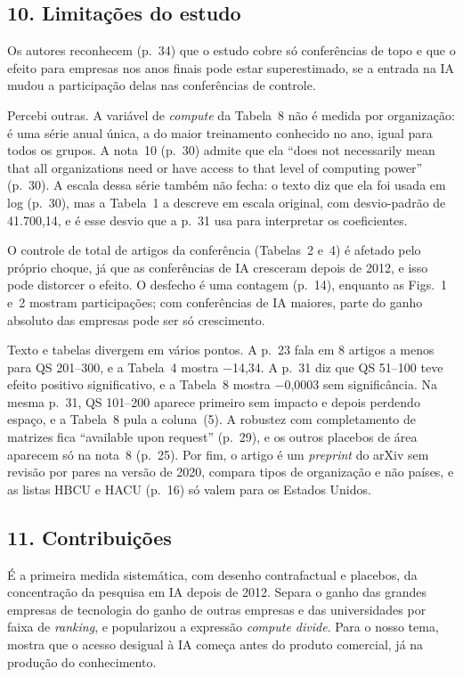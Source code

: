 \subsection*{10. Limitações do estudo}
Os autores reconhecem (p.~34) que o estudo cobre só conferências de topo e que o efeito para
empresas nos anos finais pode estar superestimado, se a entrada na IA mudou a participação delas
nas conferências de controle.

Percebi outras. A variável de \emph{compute} da Tabela~8 não é medida por organização: é uma série
anual única, a do maior treinamento conhecido no ano, igual para todos os grupos. A nota~10 (p.~30)
admite que ela ``does not necessarily mean that all organizations need or have access to that
level of computing power'' (p.~30). A escala dessa série também não fecha: o texto diz que ela foi
usada em log (p.~30), mas a Tabela~1 a descreve em escala original, com desvio-padrão de 41.700,14,
e é esse desvio que a p.~31 usa para interpretar os coeficientes.

O controle de total de artigos da conferência (Tabelas~2 e~4) é afetado pelo próprio choque, já
que as conferências de IA cresceram depois de 2012, e isso pode distorcer o efeito. O desfecho é uma
contagem (p.~14), enquanto as Figs.~1 e~2 mostram participações; com conferências de IA maiores,
parte do ganho absoluto das empresas pode ser só crescimento.

Texto e tabelas divergem em vários pontos. A p.~23 fala em 8 artigos a menos para QS 201--300, e a
Tabela~4 mostra $-$14,34. A p.~31 diz que QS 51--100 teve efeito positivo significativo, e a
Tabela~8 mostra $-$0,0003 sem significância. Na mesma p.~31, QS 101--200 aparece primeiro sem
impacto e depois perdendo espaço, e a Tabela~8 pula a coluna~(5). A robustez com completamento de
matrizes fica ``available upon request'' (p.~29), e os outros placebos de área aparecem só na
nota~8 (p.~25). Por fim, o artigo é um \emph{preprint} do arXiv sem revisão por pares na versão de
2020, compara tipos de organização e não países, e as listas HBCU e HACU (p.~16) só valem para os
Estados Unidos.

\subsection*{11. Contribuições}
É a primeira medida sistemática, com desenho contrafactual e placebos, da concentração da pesquisa
em IA depois de 2012. Separa o ganho das grandes empresas de tecnologia do ganho de outras empresas
e das universidades por faixa de \emph{ranking}, e popularizou a expressão \emph{compute divide}.
Para o nosso tema, mostra que o acesso desigual à IA começa antes do produto comercial, já na
produção do conhecimento.

